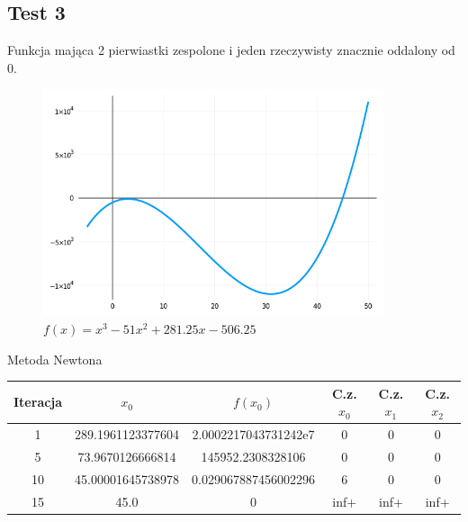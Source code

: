 \documentclass[a4paper]{article}
\begin{document}
\newpage
\subsection{Test 3}
    Funkcja mająca 2 pierwiastki zespolone i jeden rzeczywisty znacznie oddalony od 0.
    \begin{figure}[h]
        \centering
        \includegraphics[width=10cm]{3}
        \caption{$f(x) = x^3 - 51x^2 + 281.25x - 506.25$}
    \end{figure}

    \begin{center}
        Metoda Newtona
    \end{center}
    \begin{center}
        \begin{tabular}{|c|c|c|c|c|c|} 
            \hline
            Iteracja & $x_0$ & $f(x_0)$ & C.z. $x_0$ & C.z. $x_1$ & C.z. $x_2$ \\
            \hline
            1 & 289.1961123377604 & 2.0002217043731242e7 & 0 & 0 & 0 \\
            \hline
            5 & 73.9670126666814 & 145952.2308328106 & 0 & 0 & 0 \\
            \hline
            10 & 45.00001645738978 & 0.029067887456002296 & 6 & 0 & 0 \\
            \hline
            15 & 45.0 & 0 & inf+ & inf+ & inf+ \\
            \hline
        \end{tabular}
    \end{center}
        
    \vspace{5mm}
\end{document}
